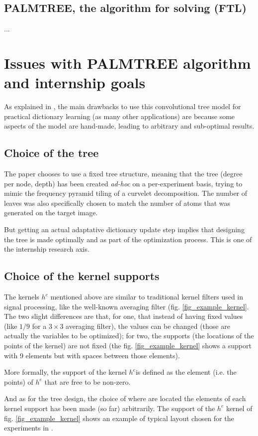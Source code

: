 \subsection{PALMTREE, the algorithm for solving (FTL)}
...

\section{Issues with PALMTREE algorithm and internship goals}
As explained in \cite[p. 23]{chabiron_optimization_2016}, the main drawbacks to use this convolutional tree model for practical dictionary learning (as many other applications) are because some aspects of the model are hand-made, leading to arbitrary and sub-optimal results.
\subsection{Choice of the tree}
The paper chooses to use a fixed tree structure, meaning that the tree (degree per node, depth) has been created \emph{ad-hoc} on a per-experiment basis, trying to mimic the frequency pyramid tiling of a curvelet decomposition. The number of leaves was also specifically chosen to match the number of atoms that was generated on the target image.

But getting an actual adaptative dictionary update step implies that designing the tree is made optimally and as part of the optimization process. This is one of the internship research axis.

\subsection{Choice of the kernel supports}
The kernels $h^e$ mentioned above are similar to traditional kernel filters used in signal processing, like the well-known averaging filter (fig. \ref{fig_example_kernel}. The two slight differences are that, for one, that instead of having fixed values (like $1/9$ for a $3\times3$ averaging filter), the values can be changed (those are actually the variables to be optimized); for two, the supports (the locations of the points of the kernel) are not fixed (the fig. \ref{fig_example_kernel} shows a support with 9 elements but with spaces between those elements).



More formally, the support of the kernel $h^e$is defined as the element (i.e. the points) of $h^e$ that are free to be non-zero.

And as for the tree design, the choice of where are located the elements of each kernel support has been made (so far) arbitrarily. The support of the $h^e$ kernel of fig. \ref{fig_example_kernel} shows an example of typical layout chosen for the experiments in \cite{chabiron_optimization_2016}. 

